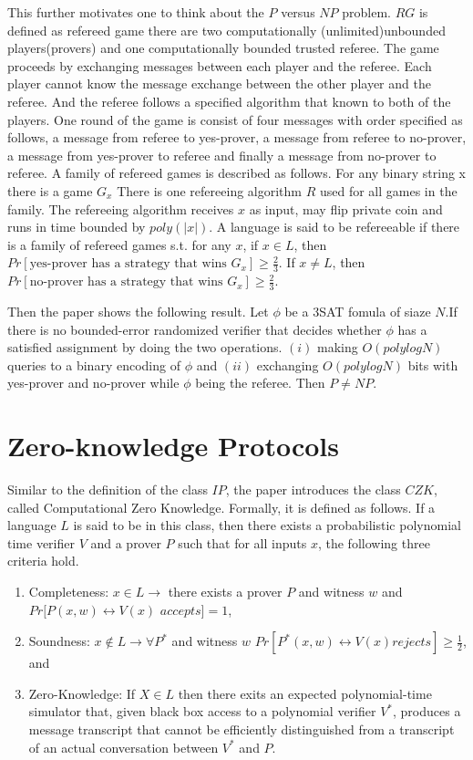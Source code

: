 \documentclass{article}
\begin{document}
This further motivates one to think about the $P$ versus $NP$ problem. $RG$ is defined as refereed game there are two computationally (unlimited)unbounded players(provers) and one computationally bounded trusted referee. The game proceeds by exchanging messages between each player and the referee. Each player cannot know the message exchange between the other player and the referee. And the referee follows a specified algorithm that known to both of the players. One round of the game is consist of four messages with order specified as follows, a message from referee to yes-prover, a message from referee to no-prover, a message from yes-prover to referee and finally a message from no-prover to referee. A family of refereed games is described as follows. For any binary string x there is a game $G_x$ There is one refereeing algorithm $R$ used for all games in the family. The refereeing algorithm receives $x$ as input, may flip private coin and runs in time bounded by $poly(|x|)$. A language is said to be refereeable if there is a family of refereed games s.t. for any $x$, if $x\in L$, then $Pr[\text{yes-prover has a strategy that wins } G_x] \ge \frac{2}{3}$. If $x \neq L$, then $Pr[\text{no-prover has a strategy that wins } G_x] \ge \frac{2}{3}$.
    
Then the paper shows the following result. Let $\phi$ be a 3SAT fomula of siaze $N$.If there is no bounded-error randomized verifier that decides whether $\phi$ has a satisfied assignment by doing the two operations. $(i)$ making $O(polylogN)$ queries to a binary encoding of $\phi$ and $(ii)$ exchanging $O(polylogN)$ bits with yes-prover and no-prover while $\phi$ being the referee. Then $P \neq NP$.



\section{Zero-knowledge Protocols}

Similar to the definition of the class $IP$, the paper introduces the class $CZK$, called Computational Zero Knowledge. Formally, it is defined as follows. If a language $L$ is said to be in this class, then there exists a probabilistic polynomial time verifier $V$ and a prover $P$ such that for all inputs $x$, the following three criteria hold.  

\begin{enumerate}
    \item Completeness: $x \in L \rightarrow $ there exists a prover $P$ and witness $w$ and $ Pr[ P(x,w) \leftrightarrow V(x) $ $accepts] = 1$, 
    \item Soundness: $x \not\in L \rightarrow \forall P^* $ and witness $w$ $ Pr[ P^*(x,w) \leftrightarrow V(x) rejects] \ge \frac{1}{2}$, and
    \item Zero-Knowledge: If $X\in L$ then there exits an expected polynomial-time simulator that, given black box access to a polynomial verifier $V^*$, produces a message transcript that cannot be efficiently distinguished from a transcript of an actual conversation between $V^*$ and $P$. 
\end{enumerate}
\end{document}
